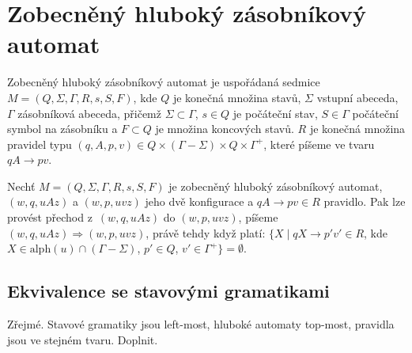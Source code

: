 
\chapter{Zobecněný hluboký zásobníkový automat}


\begin{Def}
Zobecněný hluboký zásobníkový automat je uspořádaná sedmice $M = (Q,\Sigma,\Gamma, R, s, S, F)$, 
kde $Q$ je konečná množina stavů, $\Sigma$ vstupní abeceda, $\Gamma$ zásobníková abeceda, přičemž $\Sigma \subset \Gamma$,
$s \in Q$ je počáteční stav, $S \in \Gamma$ počáteční symbol na zásobníku a $F \subset Q$ je množina
koncových stavů. $R$ je konečná množina pravidel typu $(q, A, p, v) \in Q \times (\Gamma - \Sigma) \times Q \times {\Gamma}^+$, které píšeme ve tvaru $qA \rightarrow pv$. 
\end{Def}

\begin{Def}
Nechť $M = (Q,\Sigma,\Gamma, R, s, S, F)$ je zobecněný hluboký zásobníkový automat, $(w,q,uAz)$ a $(w,p,uvz)$ jeho dvě konfigurace a $qA \rightarrow pv \in R$ pravidlo. Pak lze provést přechod z~$(w,q,uAz)$ do $(w,p,uvz)$, píšeme $(w,q,uAz) {\Rightarrow} (w,p,uvz)$, právě tehdy když platí: $\{X \mid qX \rightarrow p'v' \in R$, kde $X \in \mathrm{alph}(u) \cap (\Gamma - \Sigma)$, $p' \in Q$, $v' \in {\Gamma}^+ \} = \emptyset$.
\end{Def}

 \section{Ekvivalence se stavovými gramatikami} \label{sec_ekv_state_grammars}


Zřejmé. Stavové gramatiky jsou left-most, hluboké automaty top-most, pravidla jsou ve stejném tvaru. Doplnit.

